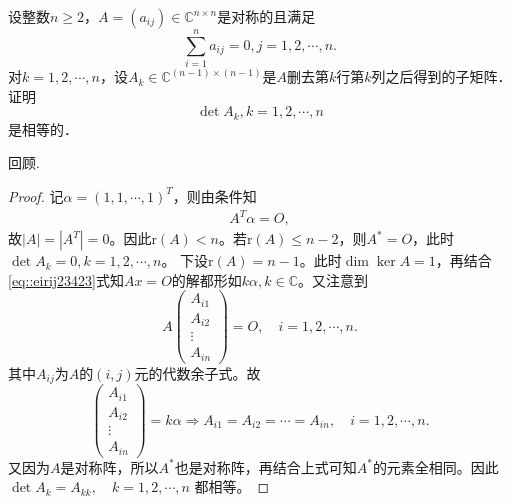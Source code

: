 \documentclass[../../main.tex]{subfiles}%
\begin{document}
\begin{example}
设整数$n \geqslant 2$，$A = (a_{ij}) \in \mathbb{C}^{n \times n}$是对称的且满足
$$\sum_{i=1}^n a_{ij} = 0, j = 1, 2, \cdots, n.$$
对$k = 1, 2, \cdots, n$，设$A_k \in \mathbb{C}^{(n-1) \times (n-1)}$是$A$删去第$k$行第$k$列之后得到的子矩阵．证明
$$\det A_k, k = 1, 2, \cdots, n$$
是相等的．
\end{example}
\begin{remark}
回顾.
\end{remark}
\begin{proof}

记$\alpha = (1,1,\cdots,1)^T$，则由条件知
\begin{align}
A^T \alpha = O, \label{eq::eirij23423}
\end{align}
故$|A| = |A^T| = 0$。因此$\text{r}(A) < n$。若$\text{r}(A) \leqslant n-2$，则$A^* = O$，此时
$\det A_k = 0, k = 1,2,\cdots,n$。
下设$\text{r}(A) = n-1$。此时$\dim \ker A = 1$，再结合\eqref{eq::eirij23423}式知$Ax = O$的解都形如$k\alpha, k \in \mathbb{C}$。又注意到
$$A\begin{pmatrix} A_{i1} \\ A_{i2} \\ \vdots \\ A_{in} \end{pmatrix} = O, \quad i = 1,2,\cdots,n.$$
其中$A_{ij}$为$A$的$(i,j)$元的代数余子式。故
$$\begin{pmatrix} A_{i1} \\ A_{i2} \\ \vdots \\ A_{in} \end{pmatrix} = k\alpha \Longrightarrow A_{i1} = A_{i2} = \cdots = A_{in}, \quad i = 1,2,\cdots,n.$$
又因为$A$是对称阵，所以$A^*$也是对称阵，再结合上式可知$A^*$的元素全相同。因此
$\det A_k = A_{kk}, \quad k = 1,2,\cdots,n$
都相等。

\end{proof}
\end{document}
